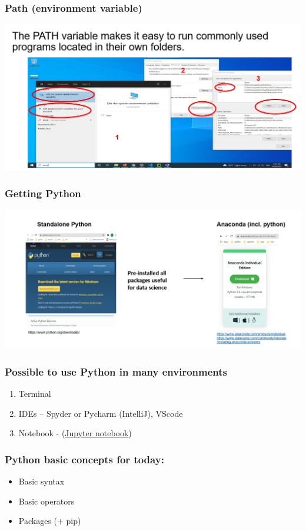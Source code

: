 \documentclass{beamer}
\begin{document}
\begin{frame}
    \frametitle{Path (environment variable)}
    \centering
    \includegraphics[scale = 0.5]{figures/path.jpg}
\end{frame}

\begin{frame}
    \frametitle{Getting Python}
    \centering
    \includegraphics[scale = 0.35]{figures/getpython.jpg}
\end{frame}

\begin{frame}
    \frametitle{Possible to use Python in many environments}

    \begin{enumerate}
        \item Terminal
        \item IDEs – Spyder or Pycharm (IntelliJ), VScode
        \item Notebook -  (\href{https://github.com/susanli2016/Machine-Learning-with-Python}
        {Jupyter notebook})
    \end{enumerate}
\end{frame}

\begin{frame}
    \frametitle{Python basic concepts for today:}

    \begin{itemize}
        \item Basic syntax
        \item Basic operators
        \item Packages (+ pip) %
    \end{itemize}
\end{frame}
\end{document}
